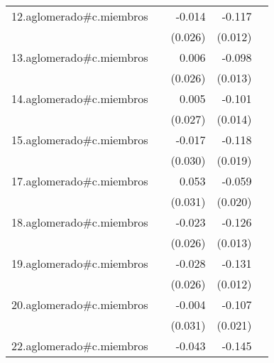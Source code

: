 {\begin{longtable}{l*{4}{D{.}{.}{-1}}}
\addlinespace
12.aglomerado#c.miembros&                     &      -0.014         &      -0.117\sym{***}&                     \\
            &                     &     (0.026)         &     (0.012)         &                     \\
\addlinespace
13.aglomerado#c.miembros&                     &       0.006         &      -0.098\sym{***}&                     \\
            &                     &     (0.026)         &     (0.013)         &                     \\
\addlinespace
14.aglomerado#c.miembros&                     &       0.005         &      -0.101\sym{***}&                     \\
            &                     &     (0.027)         &     (0.014)         &                     \\
\addlinespace
15.aglomerado#c.miembros&                     &      -0.017         &      -0.118\sym{***}&                     \\
            &                     &     (0.030)         &     (0.019)         &                     \\
\addlinespace
17.aglomerado#c.miembros&                     &       0.053         &      -0.059\sym{**} &                     \\
            &                     &     (0.031)         &     (0.020)         &                     \\
\addlinespace
18.aglomerado#c.miembros&                     &      -0.023         &      -0.126\sym{***}&                     \\
            &                     &     (0.026)         &     (0.013)         &                     \\
\addlinespace
19.aglomerado#c.miembros&                     &      -0.028         &      -0.131\sym{***}&                     \\
            &                     &     (0.026)         &     (0.012)         &                     \\
\addlinespace
20.aglomerado#c.miembros&                     &      -0.004         &      -0.107\sym{***}&                     \\
            &                     &     (0.031)         &     (0.021)         &                     \\
\addlinespace
22.aglomerado#c.miembros&                     &      -0.043         &      -0.145\sym{***}&                     \\

\end{longtable}}
